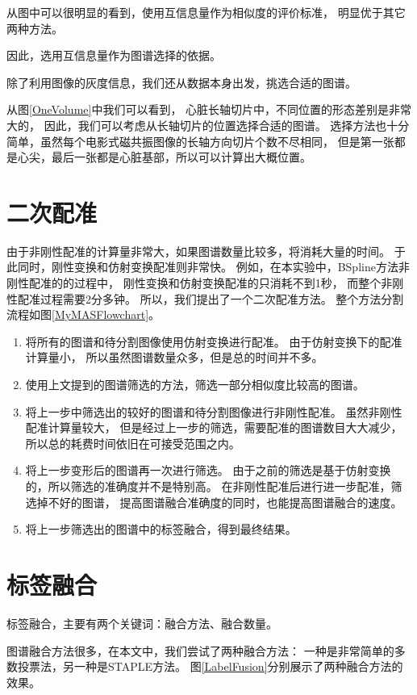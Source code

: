 从图中可以很明显的看到，使用互信息量作为相似度的评价标准，
明显优于其它两种方法。

因此，选用互信息量作为图谱选择的依据。

除了利用图像的灰度信息，我们还从数据本身出发，挑选合适的图谱。

从图\ref{OneVolume}中我们可以看到，
心脏长轴切片中，不同位置的形态差别是非常大的，
因此，我们可以考虑从长轴切片的位置选择合适的图谱。
选择方法也十分简单，虽然每个电影式磁共振图像的长轴方向切片个数不尽相同，
但是第一张都是心尖，最后一张都是心脏基部，所以可以计算出大概位置。


\section{二次配准}
由于非刚性配准的计算量非常大，如果图谱数量比较多，将消耗大量的时间。
于此同时，刚性变换和仿射变换配准则非常快。
例如，在本实验中，BSpline方法非刚性配准的的过程中，
刚性变换和仿射变换配准的只消耗不到1秒，
而整个非刚性配准过程需要2分多钟。
所以，我们提出了一个二次配准方法。
整个方法分割流程如图\ref{MyMASFlowchart}。
\begin{enumerate}
  \item 将所有的图谱和待分割图像使用仿射变换进行配准。
    由于仿射变换下的配准计算量小，
    所以虽然图谱数量众多，但是总的时间并不多。
  \item 使用上文提到的图谱筛选的方法，筛选一部分相似度比较高的图谱。
  \item 将上一步中筛选出的较好的图谱和待分割图像进行非刚性配准。
    虽然非刚性配准计算量较大，
    但是经过上一步的筛选，需要配准的图谱数目大大减少，
    所以总的耗费时间依旧在可接受范围之内。
  \item 将上一步变形后的图谱再一次进行筛选。
    由于之前的筛选是基于仿射变换的，所以筛选的准确度并不是特别高。
    在非刚性配准后进行进一步配准，筛选掉不好的图谱，
    提高图谱融合准确度的同时，也能提高图谱融合的速度。
  \item 将上一步筛选出的图谱中的标签融合，得到最终结果。
\end{enumerate}


\section{标签融合}

标签融合，主要有两个关键词：融合方法、融合数量。

图谱融合方法很多，在本文中，我们尝试了两种融合方法：
一种是非常简单的多数投票法，另一种是STAPLE方法。
图\ref{LabelFusion}分别展示了两种融合方法的效果。

